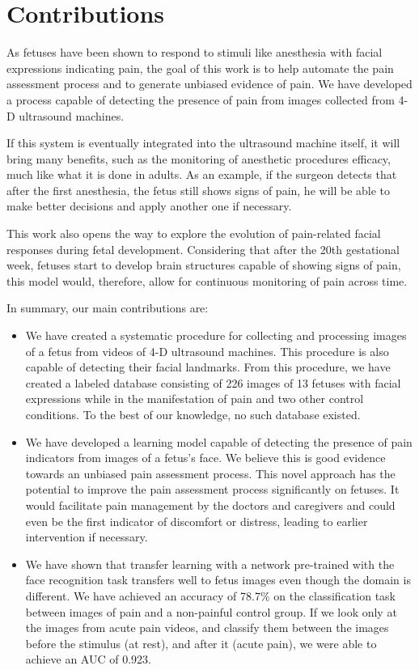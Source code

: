 \section{Contributions}

As fetuses have been shown to respond to stimuli like anesthesia with facial expressions indicating pain, the goal of this work is to help automate the pain assessment process and to generate unbiased evidence of pain. We have developed a process capable of detecting the presence of pain from images collected from 4-D ultrasound machines.

If this system is eventually integrated into the ultrasound machine itself, it will bring many benefits, such as the monitoring of anesthetic procedures efficacy, much like what it is done in adults. As an example, if the surgeon detects that after the first anesthesia, the fetus still shows signs of pain, he will be able to make better decisions and apply another one if necessary.

This work also opens the way to explore the evolution of pain-related facial responses during fetal development. Considering that after the 20th gestational week, fetuses start to develop brain structures capable of showing signs of pain, this model would, therefore, allow for continuous monitoring of pain across time.

In summary, our main contributions are:

\begin{itemize}
    \item We have created a systematic procedure for collecting and processing images of a fetus from videos of 4-D ultrasound machines. This procedure is also capable of detecting their facial landmarks. From this procedure, we have created a labeled database consisting of 226 images of 13 fetuses with facial expressions while in the manifestation of pain and two other control conditions. To the best of our knowledge, no such database existed.
    
    \item We have developed a learning model capable of detecting the presence of pain indicators from images of a fetus's face. We believe this is good evidence towards an unbiased pain assessment process. This novel approach has the potential to improve the pain assessment process significantly on fetuses. It would facilitate pain management by the doctors and caregivers and could even be the first indicator of discomfort or distress, leading to earlier intervention if necessary.
    
    \item We have shown that transfer learning with a network pre-trained with the face recognition task transfers well to fetus images even though the domain is different. We have achieved an accuracy of 78.7\% on the classification task between images of pain and a non-painful control group. If we look only at the images from acute pain videos, and classify them between the images before the stimulus (at rest), and after it (acute pain), we were able to achieve an AUC of 0.923. 
\end{itemize}

